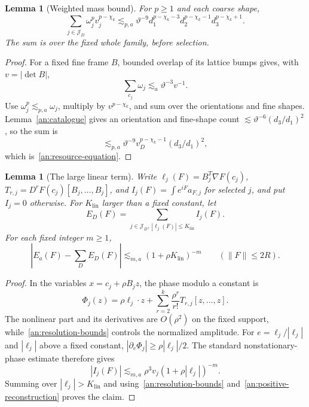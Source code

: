 \documentclass[11pt]{amsart}
\newtheorem{lemma}[theorem]{Lemma}
\theoremstyle{definition}
\theoremstyle{remark}
\numberwithin{equation}{section}
\begin{document}
\begin{lemma}[Weighted mass bound]\label{an:resource}
For $p\ge1$ and each coarse shape,
\begin{equation}\label{an:resource-equation}
\sum_{j\in\mathcal J_D}\omega_j^pv_j^{p-\chi_k}\lesssim_{p,a} \vartheta^{-9}d_1^{p-\chi_k-3}d_2^{p-\chi_k-1}d_3^{p-\chi_k+1}.
\end{equation}
The sum is over the fixed whole family, before selection.
\end{lemma}
\begin{proof}
For a fixed fine frame $B$, bounded overlap of its lattice bumps gives, with $v=|\det B|$,
\[
\sum_{c_j}\omega_j\lesssim_a \vartheta^{-3}v^{-1}.
\]
Use $\omega_j^p\lesssim_{p,a} \omega_j$, multiply by $v^{p-\chi_k}$, and sum over the orientations and fine shapes. Lemma~\ref{an:catalogue} gives an orientation and fine-shape count $\lesssim\vartheta^{-6}(d_3/d_1)^2$, so the sum is
\[
\lesssim_{p,a}\vartheta^{-9}v_D^{p-\chi_k-1}(d_3/d_1)^2,
\]
which is~\eqref{an:resource-equation}.
\end{proof}

\begin{lemma}[The large linear term]\label{an:linear-tail}
Write $\ell_j(F)=B_j^T\nabla F(c_j)$, $T_{r,j}=D^rF(c_j)[B_j,\ldots,B_j]$, and $I_j(F)=\int e^{iF}a_{F,j}$ for selected $j$, and put $I_j=0$ otherwise. For $K_{\mathrm{lin}}$ larger than a fixed constant, let
\[
E_D(F)=\sum_{j\in\mathcal J_D,\ |\ell_j(F)|\le K_{\mathrm{lin}}}I_j(F).
\]
For each fixed integer $m\ge1$,
\begin{equation}\label{an:linear-tail-equation}
\left|E_a(F)-\sum_D E_D(F)\right|\lesssim_{m,a} (1+\rho K_{\mathrm{lin}})^{-m}\qquad(\|F\|\le2R).
\end{equation}
\end{lemma}
\begin{proof}
In the variables $x=c_j+\rho B_jz$, the phase modulo a constant is
\[
\Phi_j(z)=\rho\ell_j\cdot z+\sum_{r=2}^k\frac{\rho^r}{r!}T_{r,j}[z,\ldots,z].
\]
The nonlinear part and its derivatives are $O(\rho^2)$ on the fixed support, while~\eqref{an:resolution-bounds} controls the normalized amplitude. For $e=\ell_j/|\ell_j|$ and $|\ell_j|$ above a fixed constant, $|\partial_e\Phi_j|\ge\rho|\ell_j|/2$. The standard nonstationary-phase estimate therefore gives
\[
|I_j(F)|\lesssim_{m,a} \rho^3v_j(1+\rho|\ell_j|)^{-m}.
\]
Summing over $|\ell_j|>K_{\mathrm{lin}}$ and using~\eqref{an:resolution-bounds} and~\eqref{an:positive-reconstruction} proves the claim.
\end{proof}
\end{document}
